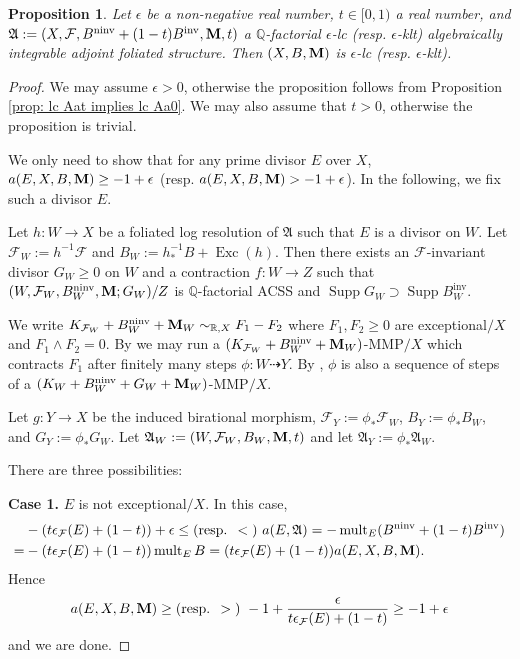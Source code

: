 \documentclass[12pt]{amsart}
\numberwithin{equation}{section}
\newcommand{\Mm}{{\bf{M}}}
\newcommand{\Exc}{\operatorname{Exc}}
\newcommand{\ninv}{\operatorname{ninv}}
\newcommand{\inv}{\operatorname{inv}}
\newcommand{\Supp}{\operatorname{Supp}}
\newcommand{\mult}{\operatorname{mult}}
\newcommand{\Aa}{{\mathfrak{A}}}
\newcommand{\Ff}{\mathcal{F}}
\newtheorem{prop}[thm]{Proposition}
\theoremstyle{definition}
\theoremstyle{definition}
\theoremstyle{definition}
\begin{document}
\begin{prop}\label{prop: algint afs elc implies x elc}
    Let $\epsilon$ be a non-negative real number, $t\in [0,1)$ a real number, and $\Aa:=(X,\Ff,B^{\ninv}+(1-t)B^{\inv},\Mm,t)$ a $\mathbb Q$-factorial $\epsilon$-lc (resp. $\epsilon$-klt) algebraically integrable adjoint foliated structure. Then $(X,B,\Mm)$ is $\epsilon$-lc  (resp. $\epsilon$-klt).
\end{prop}
\begin{proof}
    We may assume $\epsilon>0$, otherwise the proposition follows from Proposition \ref{prop: lc Aat implies lc Aa0}. We may also assume that $t>0$, otherwise the proposition is trivial.

    We only need to show that for any prime divisor $E$ over $X$, $a(E,X,B,\Mm)\geq -1+\epsilon$ (resp. $a(E,X,B,\Mm)>-1+\epsilon$). In the following, we fix such a divisor $E$.

 Let $h: W\rightarrow X$ be a foliated log resolution of $\Aa$ such that $E$ is a divisor on $W$. Let $\Ff_W:=h^{-1}\Ff$ and $B_W:=h^{-1}_*B+\Exc(h)$. Then there exists an $\Ff$-invariant divisor $G_W\geq 0$ on $W$ and a contraction $f: W\rightarrow Z$ such that $(W,\Ff_W,B_W^{\ninv},\Mm;G_W)/Z$ is $\mathbb Q$-factorial ACSS and $\Supp G_W\supset \Supp B_W^{\inv}$.

    We write $K_{\Ff_W}+B_W^{\ninv}+\Mm_W\sim_{\mathbb R,X}F_1-F_2$ where $F_1,F_2\ge 0$ are exceptional$/X$ and $F_1\wedge F_2=0$. By \cite[Theorem 9.4.1]{CHLX23} we may run a $(K_{\Ff_W}+B_W^{\ninv}+\Mm_W)$-MMP$/X$ which contracts $F_1$ after finitely many steps $\phi\colon W\dashrightarrow Y$. By \cite[Lemma 9.1.4]{CHLX23}, $\phi$ is also a sequence of steps of a $(K_{W}+B_W^{\ninv}+G_W+\Mm_W)$-MMP$/X$. 
    
    Let $g\colon Y\rightarrow X$ be the induced birational morphism, $\Ff_Y:=\phi_*\Ff_W$, $B_Y:=\phi_*B_W$, and $G_Y:=\phi_*G_W$. Let $\Aa_W:=(W,\Ff_W,B_W,\Mm,t)$ and let $\Aa_Y:=\phi_*\Aa_W$.

    There are three possibilities:

    \medskip

\noindent\textbf{Case 1.} $E$ is not exceptional$/X$. In this case,
\begin{align*}
  & -(t\epsilon_{\Ff}(E)+(1-t))+\epsilon\leq\text{(resp. }<\text{) } a(E,\Aa)=-\mult_E(B^{\ninv}+(1-t)B^{\inv})\\
   =&-(t\epsilon_{\Ff}(E)+(1-t))\mult_EB=(t\epsilon_{\Ff}(E)+(1-t))a(E,X,B,\Mm).
\end{align*}
Hence $$a(E,X,B,\Mm)\geq\text{(resp. }>\text{) }  -1+\frac{\epsilon}{t\epsilon_{\Ff}(E)+(1-t)}\geq -1+\epsilon$$
and we are done. 


\end{proof}
\end{document}
